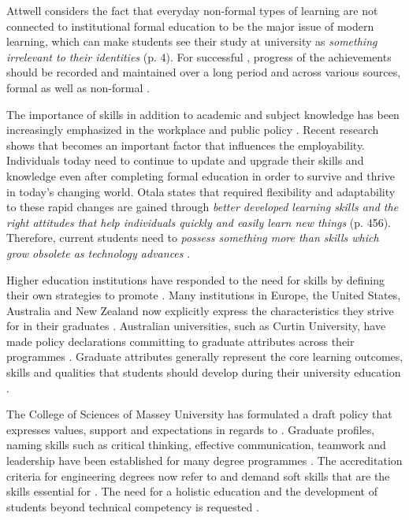 Attwell \citeyearpar{Attwell2007} considers the fact that everyday non-formal
types of learning are not connected to institutional formal education to be the
major issue of modern learning, which can make students see their study at
university as \textit{something irrelevant to their identities} (p. 4). For
successful \LLLsn, progress of the achievements should be recorded and
maintained over a long period and across various sources, formal as well as
non-formal \citep{Kay2008}.


The importance of \LLLs skills in addition to academic and subject knowledge has
been increasingly emphasized in the workplace and public policy
\citep{Morgan-Klein2007,Sutherland2006}. Recent research
\citep{Simmons-McDonald2009} shows that \LLLs becomes an important factor that
influences the employability. Individuals today need to continue to update and
upgrade their skills and knowledge even after completing formal education in
order to survive and thrive in today's changing world. Otala
\citeyearpar{Otala1997} states that required flexibility and adaptability to
these rapid changes are gained through \textit{better developed learning skills
and the right attitudes that help individuals quickly and easily learn new
things} (p. 456). Therefore, current students need to \textit{possess something
more than skills which grow obsolete as technology advances}
\cite[p.~195]{Field2003}.

Higher education institutions have responded to the need for \LLLs skills by
defining their own strategies to promote \LLLsn. Many institutions in Europe,
the United States, Australia and New Zealand now explicitly express the \LLLs
characteristics they strive for in their graduates \citep{Scanlon2006}.
Australian universities, such as Curtin University, have made policy
declarations committing to graduate attributes across their programmes
\citep{CurtinUniversity2006}. Graduate attributes generally represent the core
learning outcomes, skills and qualities that students should develop during
their university education \citep{Hughes2010}.

The College of Sciences of Massey University has formulated a draft \LLLs policy
\citep{MasseyUniversity2008} that expresses values, support and expectations in
regards to \LLLsn. Graduate profiles, naming \LLLs skills such as critical
thinking, effective communication, teamwork and leadership have been established
for many degree programmes \citep{Davies2003,McAlister2003}. The accreditation
criteria for engineering degrees now refer to and demand soft skills that are
the skills essential for \LLLs \citep{Aller2005,Muffo2001}. The need for a
holistic education and the development of students beyond technical competency
is requested \citep{Brakke2002,Davies2003,Dowling2006,Fallows2003,Grabowski2004,Hernon2006}.

